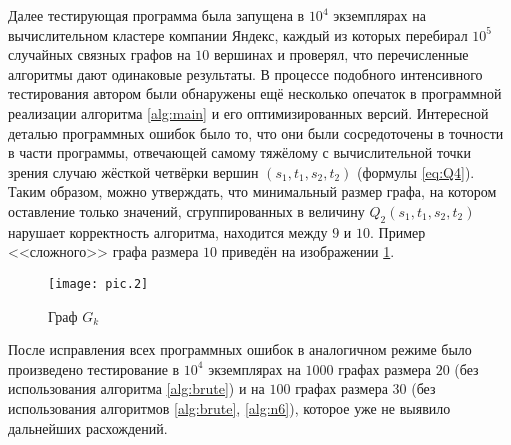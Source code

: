 Далее тестирующая программа была запущена в $10^4$ экземплярах на вычислительном кластере компании Яндекс, каждый из которых перебирал $10^5$ случайных связных графов на $10$ вершинах и проверял, что перечисленные алгоритмы дают одинаковые результаты. В процессе подобного интенсивного тестирования автором были обнаружены ещё несколько опечаток в программной реализации алгоритма \ref{alg:main} и его оптимизированных версий. Интересной деталью программных ошибок было то, что они были сосредоточены в точности в части программы, отвечающей самому тяжёлому с вычислительной точки зрения случаю жёсткой четвёрки вершин $(s_1, t_1, s_2, t_2)$ (формулы \eqref{eq:Q4}). Таким образом, можно утверждать, что минимальный размер графа, на котором оставление только значений, сгруппированных в величину $Q_2(s_1, t_1, s_2, t_2)$ нарушает корректность алгоритма, находится между $9$ и $10$. Пример <<сложного>> графа размера $10$ приведён на изображении \ref{pic:hard}. 

\begin{figure}[H]
\caption{Граф $G_k$}
\label{pic:hard}
\centering
\texttt{[image: pic.2]}
\end{figure}

После исправления всех программных ошибок в аналогичном режиме было произведено тестирование в $10^4$ экземплярах на $1000$ графах размера $20$ (без использования алгоритма \ref{alg:brute}) и на $100$ графах размера $30$ (без использования алгоритмов \ref{alg:brute}, \ref{alg:n6}), которое уже не выявило дальнейших расхождений.


